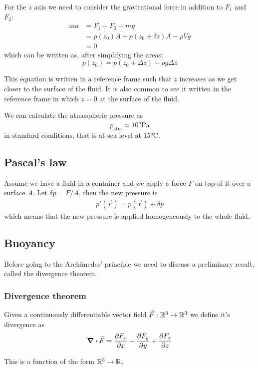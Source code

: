 \documentclass[12pt]{extarticle}
\begin{document}
For the $z$ axis we need to consider the gravitational force in addition to $F_1$ and $F_2$:
\begin{align}
    m a & = F_1 + F_2 + m g                           \\
        & = p(z_0) A + p(z_0 + \delta z) A - \rho V g \\
        & = 0
\end{align}
which can be written as, after simplifying the areas:
\begin{equation}
    p(z_0) = p(z_0 + \Delta z) + \rho g \Delta z
\end{equation}

This equation is written in a reference frame such that $z$ increases as we get closer to the surface of the fluid.
It is also common to see it written in the reference frame in which $z = 0$ at the surface of the fluid.

We can calculate the atmospheric pressure as
\begin{equation}
    p_\text{atm} \approx 10^5 \si{\pascal}
\end{equation}
in standard conditions, that is at sea level at $15 \si{\celsius}$.

\subsection{Pascal's law}

Assume we have a fluid in a container and we apply a force $F$ on top of it over a surface $A$.
Let $\delta p = F/A$, then the new pressure is
\begin{eqnarray}
    p'(\vec r) = p (\vec r) + \delta p
\end{eqnarray}
which means that the new pressure is applied homogeneously to the whole fluid.

\subsection{Buoyancy}

Before going to the Archimedes' principle we need to discuss a preliminary result, called the divergence theorem.

\subsubsection{Divergence theorem}

\begin{definition}[divergence]
    \label{def:divergence}
    Given a continuously differentiable vector field $\vec F : \mathbb{R}^3 \to \mathbb{R}^3$ we define it's divergence as
    \begin{equation}
        \div \vec F = \pdv{F_x}{x} + \pdv{F_y}{y} + \pdv{F_z}{z}
    \end{equation}

    This is a function of the form $\mathbb{R}^3 \to \mathbb{R}$.
\end{definition}
\end{document}
